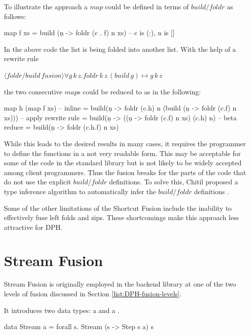 \documentclass[preamble.tex]{subfiles}
\begin{document}
To illustrate the approach a $map$ could be defined in terms of $build/foldr$ as follows:

\begin{hscode}
map f xs = build (\c n -> foldr (c . f) n xs)
-- c is (:), n is []
\end{hscode}


In the above code the list is being folded into another list. With the help of a rewrite rule

$\langle foldr/build\, fusion \rangle\forall g\, k\, z.foldr\, k\, z\,(build\, g)\mapsto g\, k\, z$

the two consecutive $map$s could be reduced to as in the following:

\begin{hscode}
map h (map f xs)
 -- inline
 = build(\c n -> foldr (c.h) n 
  (build (\c n -> foldr (c.f) n xs)))
 -- apply rewrite rule
 = build(\c n -> ((\c n -> foldr (c.f) n xs) (c.h) n)
 -- beta reduce
 = build(\c n -> foldr (c.h.f) n xs)
\end{hscode}


While this leads to the desired results in many cases, it requires the programmer to define the functions in a not very readable form. This may be acceptable for some of the code in the standard library but is not likely to be widely accepted among client programmers. Thus the fusion breaks for the parts of the code that do not use the explicit $build/foldr$ definitions. To solve this, Chitil proposed a type inference algorithm to automatically infer the $build/foldr$ definitions \cite{Chi99}.

Some of the other limitations of the Shortcut Fusion include the inability to effectively fuse left folds and zips. These shortcomings make this approach less attractive for DPH.


\clearpage

\section{Stream Fusion}
\label{sec:Stream-Fusion}
\istreamfusion{}

Stream Fusion \cite{CLS07,CSL06} is originally employed in the \DPH backend library at one of the two levels of fusion discussed in Section \vref{list:DPH-fusion-levels}.

It introduces two data types: a  and a .

\begin{hscode}
data Stream a = forall s. Stream (s -> Step s a) s
\end{hscode}
\end{document}
